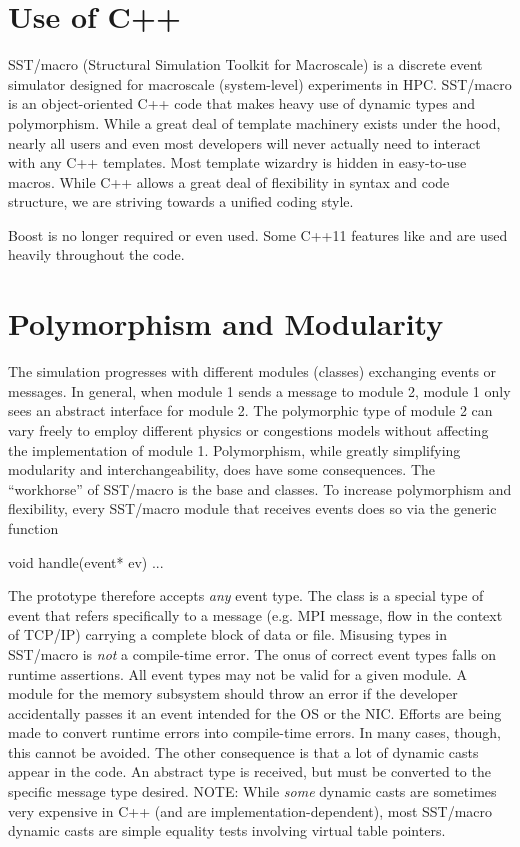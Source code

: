 \section{Use of C++}
SST/macro (Structural Simulation Toolkit for Macroscale) is a discrete event simulator designed for macroscale (system-level) experiments in HPC. 
SST/macro is an object-oriented C++ code that makes heavy use of dynamic types and polymorphism.
While a great deal of template machinery exists under the hood, nearly all users and even most developers will never actually need to interact with any C++ templates.
Most template wizardry is hidden in easy-to-use macros.
While C++ allows a great deal of flexibility in syntax and code structure, we are striving towards a unified coding style.

Boost is no longer required or even used.
Some C++11 features like  and  are used heavily throughout the code.

\section{Polymorphism and Modularity}\label{sec:polymorphism}
The simulation progresses with different modules (classes) exchanging events or messages.
In general, when module 1 sends a message to module 2, module 1 only sees an abstract interface for module 2.
The polymorphic type of module 2 can vary freely to employ different physics or congestions models without affecting the implementation of module 1. 
Polymorphism, while greatly simplifying modularity and interchangeability, does have some consequences.
The ``workhorse'' of SST/macro is the base  and  classes.
To increase polymorphism and flexibility, every SST/macro module that receives events does so via the generic function

\begin{CppCode}
void handle(event* ev){
...
}
\end{CppCode}
The prototype therefore accepts \emph{any} event type. 
The class  is a special type of event that refers specifically to a message (e.g. MPI message, flow in the context of TCP/IP) carrying a complete block of data or file.
Misusing types in SST/macro is \emph{not} a compile-time error.
The onus of correct event types falls on runtime assertions.
All event types may not be valid for a given module.
A module for the memory subsystem should throw an error if the developer accidentally passes it an event intended for the OS or the NIC.
Efforts are being made to convert runtime errors into compile-time errors.
In many cases, though, this cannot be avoided.
The other consequence is that a lot of dynamic casts appear in the code.
An abstract  type is received, but must be converted to the specific message type desired.
NOTE: While \emph{some} dynamic casts are sometimes very expensive in C++ (and are implementation-dependent),
most SST/macro dynamic casts are simple equality tests involving virtual table pointers.

